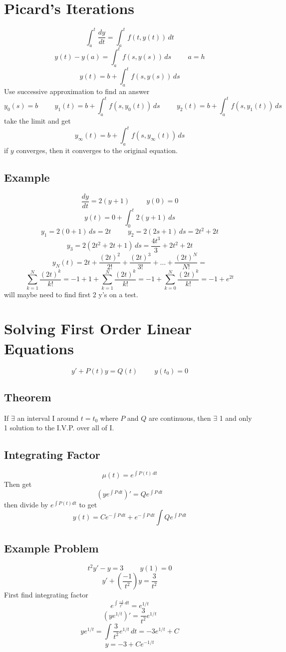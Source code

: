 \documentclass[fleqn]{report}
\newcommand{\hp}{\hspace{1cm}}
\begin{document}
\section{Picard's Iterations}
\[
\int^t_a \frac{dy}{dt} = \int^t_a f(t, y(t)) \, dt
\]
\[
y(t) - y(a) = \int^t_a f(s, y(s)) \, ds
\hp a = h
\]
\[
y(t) = b + \int^t_a f(s, y(s)) \, ds
\]
Use successive approximation to find an answer
\[
y_0(s) = b
\hp
y_1(t) = b + \int^t_a f(s, y_0(t)) \, ds
\hp
y_2(t) = b + \int^t_a f(s, y_1(t)) \, ds
\]
take the limit and get
\[
y_\infty(t) = b + \int^t_a f(s, y_\infty(t)) \, ds
\]
if $y$ converges, then it converges to the original equation.

\subsection{Example}
\[
\frac{dy}{dt} = 2(y + 1)
\hp
y(0) = 0
\]
\[
y(t) = 0 + \int^t_0 2(y + 1) \, ds
\]
\[
y_1 = 2(0 + 1) \, ds = 2t
\hp
y_2 = 2(2s + 1) \, ds = 2t^2 + 2t
\]
\[
y_3 = 2(2t^2 + 2t + 1) \, ds = \frac{4t^3}{3} + 2t^2 + 2t
\]
\[
y_N(t) = 2t + \frac{(2t)^2}{2!} + \frac{(2t)^3}{3!} + \ldots + \frac{(2t)^N}{N!} 
=
\]
\[
\sum^N_{k = 1} \frac{(2t)^k}{k!}
=
-1 + 1 + \sum^N_{k = 1} \frac{(2t)^k}{k!}
=
-1 + \sum^N_{k = 0} \frac{(2t)^k}{k!}
=
-1 + e^{2t}
\]
will maybe need to find first 2 y's on a test.


\section{Solving First Order Linear Equations}
\[
y' + P(t)y = Q(t)
\hp
y(t_0) = 0
\]

\subsection{Theorem}
If $\exists$ an interval I around $t = t_0$ where $P$ and $Q$ are continuous, then $\exists$ 1 and only 1 solution to the I.V.P. over all of I.

\subsection{Integrating Factor}
\[
\mu(t) = e^{\int P(t) \, dt}
\]
Then get
\[
(y e^{\int P \, dt} )' = Q e^{\int P \, dt}
\]
then divide by $e^{\int P(t) dt}$ to get
\[
y(t) = Ce^{-\int P \, dt} + e^{- \int P \, dt} \int Q e^{\int P \, dt}
\]

\subsection{Example Problem}
\[
t^2 y' - y = 3
\hp
y(1) = 0
\]
\[
y' + (\frac{-1}{t^2})y = \frac{3}{t^2}
\]
First find integrating factor
\[
e^{\int \frac{-1}{t^2} \, dt} = e^{1/t}
\]
\[
(ye^{1/t})' = \frac{3}{t^2}e^{1/t}
\]
\[
ye^{1/t} = \int \frac{3}{t^2}e^{1/t} \, dt = -3e^{1/t} + C
\]
\[
y = -3 + Ce^{-1/t}
\]
\end{document}
